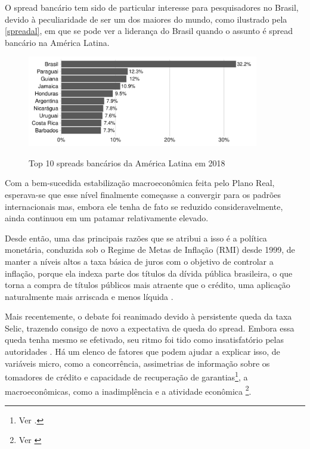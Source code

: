 \documentclass[a4paper,
               article,
               12pt,
               openany,
               oneside,
               english,
               brazil]{abntex2}
\numberwithin{equation}{section}
\begin{document}
    O spread bancário tem sido de particular interesse para pesquisadores no Brasil, devido à peculiaridade de ser um dos maiores do mundo, como ilustrado pela \autoref{spreadal}, em que se pode ver a liderança do Brasil quando o assunto é spread bancário na América Latina.

    \begin{figure}[h]
        \centering
        \caption{Top 10 spreads bancários da América Latina em 2018}
        \includegraphics[width = 0.9\textwidth, scale=1]{spread_AL.pdf}
        \label{spreadal}
    \end{figure}

    Com a bem-sucedida estabilização macroeconômica feita pelo Plano Real, esperava-se que esse nível finalmente começasse a convergir para os padrões internacionais mas, embora ele tenha de fato se reduzido consideravelmente, ainda continuou em um patamar relativamente elevado.

    Desde então, uma das principais razões que se atribui a isso é a política monetária, conduzida sob o Regime de Metas de Inflação (RMI) desde 1999, de manter a níveis altos a taxa básica de juros com o objetivo de controlar a inflação, porque ela indexa parte dos títulos da dívida pública brasileira, o que torna a compra de títulos públicos mais atraente que o crédito, uma aplicação naturalmente mais arriscada e menos líquida \cite[p.~7]{manhica12}.
    
    Mais recentemente, o debate foi reanimado devido à persistente queda da taxa Selic, trazendo consigo de novo a expectativa de queda do spread. Embora essa queda tenha mesmo se efetivado, seu ritmo foi tido como insatisfatório pelas autoridades \cite{valor1}. Há um elenco de fatores que podem ajudar a explicar isso, de variáveis micro, como a concorrência, assimetrias de informação sobre os tomadores de crédito e capacidade de recuperação de garantias\footnote{Ver \cite[p.~13]{reb2018}.}, a macroeconômicas, como a inadimplência e  a atividade econômica \footnote{Ver \cite{valor2}}.
    
\end{document}
